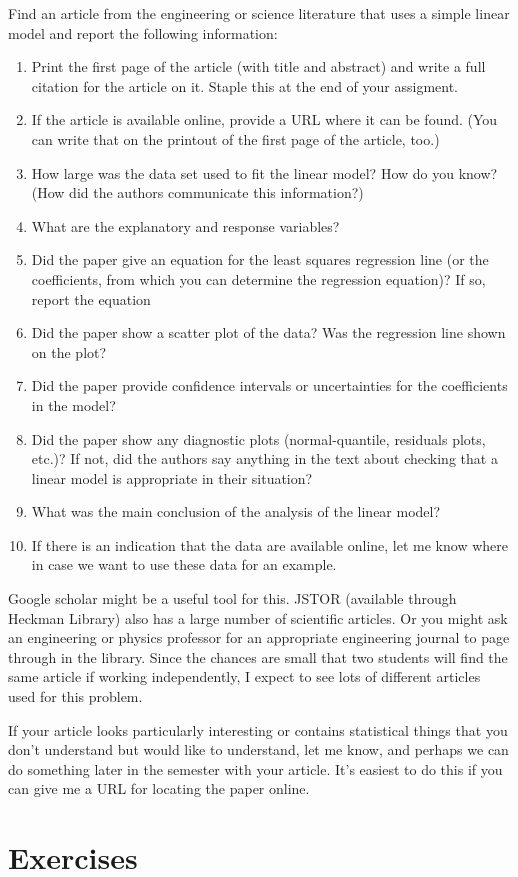 \documentclass[twoside]{book}
\newcounter{example}[section]
\newif\ifsolutions
\newif\ifsolutionslocal
\begin{document}
\begin{problem}
	Find an article from the engineering or science literature that uses 
	a simple linear model and report the following information:
	\begin{enumerate}
		\item
			Print the first page of the article (with title and abstract) and write
			a full citation for the article on it.  Staple this at the end of your
			assigment.
		\item
			If the article is available online, provide a URL where it can be found.
			(You can write that on the printout of the first page of the article, too.)
		\item
			How large was the data set used to fit the linear model?  How do you know?  (How 
			did the authors communicate this information?)
		\item
			What are the explanatory and response variables?
		\item
			Did the paper give an equation for the least squares regression line 
			(or the coefficients, from which you can determine the regression equation)?
			If so, report the equation
		\item
			Did the paper show a scatter plot of the data?  Was the regression line 
			shown on the plot?
		\item
			Did the paper provide confidence intervals or uncertainties for the 
			coefficients in the model?
		\item
			Did the paper show any diagnostic plots (normal-quantile, residuals plots, etc.)?
			If not, did the authors say anything in the text about checking that 
			a linear model is appropriate in their situation?
		\item
			What was the main conclusion of the analysis of the linear model?
		\item
				If there is an indication that the data are available online,
				let me know where in case we want to use these data for an example.
	\end{enumerate}
	Google scholar might be a useful tool for this.  JSTOR (available through Heckman
	Library) also has a large number of scientific articles.  Or you might ask an
	engineering or physics professor for an appropriate engineering journal to
	page through in the library.  Since the chances are small that two students
	will find the same article if working independently, I expect to see lots
	of different articles used for this problem.

	If your article looks particularly interesting or contains statistical 
	things that you don't understand but would like to understand, let me know,
	and perhaps we can do something later in the semester with your article.
	It's easiest to do this if you can give me a URL for locating the paper online.
\end{problem}


\newpage
\section*{Exercises}
\shipoutProblems


\ifsolutions
\ifsolutionslocal
\newpage
\section*{Solutions}
\shipoutSolutions
\fi
\fi



\end{document}
